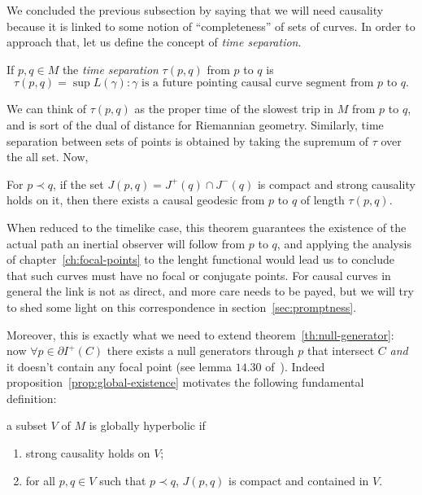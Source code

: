 We concluded the previous subsection by saying that we will need causality because it is linked to some notion of ``completeness'' of sets of curves. In order to approach that, let us define the concept of \emph{time separation}.
\begin{definition}
	If \(p,q\in M\) the \emph{time separation} \(\tau (p,q)\) from \(p\) to \(q\) is
	\[
		\tau (p,q) = \sup{L(\gamma): \gamma\text{ is a future pointing causal curve segment from } p \text{ to } q}.
	\]
\end{definition}
We can think of \(\tau (p,q)\) as the proper time of the slowest trip in \(M\) from \(p\) to \(q\), and is sort of the dual of distance for Riemannian geometry.
Similarly, time separation between sets of points is obtained by taking the supremum of \(\tau\) over the all set. Now,
\begin{prop}
	\label{prop:global-existence}
	For \(p \prec q\), if the set \(J(p, q) = J^+(q) \cap J^-(q)\) is compact and strong causality holds on it, then there exists a causal geodesic from \(p\) to \(q\) of length \(\tau (p,q)\).
\end{prop}
When reduced to the timelike case, this theorem guarantees the existence of the actual path an inertial observer will follow from \(p\) to \(q\), and applying the analysis of chapter~\ref{ch:focal-points} to the lenght functional would lead us to conclude that such curves must have no focal or conjugate points. For causal curves in general the link is not as direct, and more care needs to be payed, but we will try to shed some light on this correspondence in section~\ref{sec:promptness}.

Moreover, this is exactly what we need to extend theorem~\ref{th:null-generator}: now \(\forall p\in \partial I^+(C)\)  there exists a null generators through \(p\) that intersect \(C\) \emph{and} it doesn't contain any focal point (see lemma \(14.30\) of~\cite{o1983semi}).
Indeed proposition~\ref{prop:global-existence} motivates the following fundamental definition:
\begin{definition}
	\label{def:global-hyper}
	a subset \(V\) of \(M\) is globally hyperbolic if 
	\begin{enumerate}
		\item strong causality holds on \(V\);
  		\item for all \(p, q \in V\) such that \(p \prec q\), \(J(p,q)\) is compact and contained in \(V\).
	\end{enumerate}
\end{definition}

